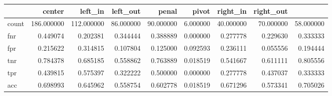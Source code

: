 \begin{tabular}{lrrrrrrrr}
\toprule
{} &      center &    left\_in &   left\_out &     penal &      pivot &   right\_in &  right\_out \\
\midrule
count &  186.000000 &  112.000000 &  86.000000 &  90.000000 &  6.000000 &  40.000000 &  70.000000 &  58.000000 \\
fnr   &    0.449074 &    0.202381 &   0.344444 &   0.388889 &  0.000000 &   0.277778 &   0.229630 &   0.333333 \\
fpr   &    0.215622 &    0.314815 &   0.107804 &   0.125000 &  0.092593 &   0.236111 &   0.055556 &   0.194444 \\
tnr   &    0.784378 &    0.685185 &   0.558862 &   0.763889 &  0.018519 &   0.541667 &   0.611111 &   0.805556 \\
tpr   &    0.439815 &    0.575397 &   0.322222 &   0.500000 &  0.000000 &   0.277778 &   0.437037 &   0.333333 \\
acc   &    0.698993 &    0.645962 &   0.558754 &   0.602778 &  0.018519 &   0.671296 &   0.573341 &   0.705026 \\
\bottomrule
\end{tabular}

